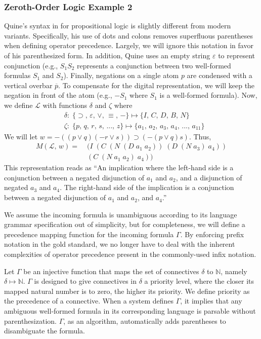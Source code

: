 \documentclass[ms]{uncgdissertationexp2}
\theoremstyle{plain}
\theoremstyle{definition}
\theoremstyle{remark}
\begin{document}
\subsubsection{Zeroth-Order Logic Example 2}
Quine's syntax in \cite{methodsoflogic} for propositional logic is slightly different from modern variants. Specifically, his use of dots and colons removes superfluous parentheses when defining operator precedence. Largely, we will ignore this notation in favor of his parenthesized form. In addition, Quine uses an empty string $\varepsilon$ to represent conjunction (e.g., $S_{1}S_{2}$ represents a conjunction between two well-formed formulas $S_{1}$ and $S_{2}$). Finally, negations on a single atom $p$ are condensed with a vertical overbar $\overline{p}$. To compensate for the digital representation, we will keep the negation in front of the atom (e.g., $-S_1$ where $S_1$ is a well-formed formula). Now, we define $\mathcal{L}$ with functions $\delta$ and $\zeta$ where
\begin{align*}
	& \delta:\;\{\supset,\,\varepsilon,\,\lor,\,\equiv,\,-\}\mapsto \{I,\,C,\,D,\,B,\,N\} \\
	& \zeta:\;\{p,\,q,\,r,\,s,\,...,\,z\} \mapsto \{a_{1},\,a_{2},\,a_{3},\,a_{4},\,...,\,a_{11}\}  
\end{align*}
We will let $w = -((p\lor q)(-r\lor s)) \supset (-(p\lor q)s)$. Thus,
\begin{align*}
	M(\mathcal{L},\,w) =\;&(I\;(C\;(N\;(D\;a_1\;a_2))\;(D\;(N\;a_3)\;a_4))\\
					   	 &(C\;(N\;a_1\;a_2)\;a_4))
\end{align*}
This representation reads as ``An implication where the left-hand side is a conjunction between a negated disjunction of $a_1$ and $a_2$, and a disjunction of negated $a_3$ and $a_4$. The right-hand side of the implication is a conjunction between a negated disjunction of $a_1$ and $a_2$, and $a_4$.''

We assume the incoming formula is unambiguous according to its language grammar specification out of simplicity, but for completeness, we will define a precedence mapping function for the incoming formula $\Gamma$. By enforcing prefix notation in the gold standard, we no longer have to deal with the inherent complexities of operator precedence present in the commonly-used infix notation.

Let $\Gamma$ be an injective function that maps the set of connectives $\delta$ to $\mathbb{N}$, namely $\delta \mapsto \mathbb{N}$. $\Gamma$ is designed to give connectives in $\delta$ a priority level, where the closer its mapped natural number is to zero, the higher its priority. We define priority as the precedence of a connective. When a system defines $\Gamma$, it implies that any ambiguous well-formed formula in its corresponding language is parsable without parenthesization. $\Gamma$, as an algorithm, automatically adds parentheses to disambiguate the formula.
\end{document}
